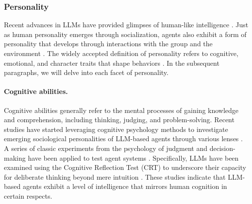 \subsubsection{Personality}\label{sec:social personality}
Recent advances in LLMs have provided glimpses of human-like intelligence \cite{browning2023personhood}. 
Just as human personality emerges through socialization, agents also exhibit a form of personality that develops through interactions with the group and the environment \cite{DBLP:journals/corr/abs-2206-07550, DBLP:journals/corr/abs-2302-02083}. 
The widely accepted definition of personality refers to cognitive, emotional, and character traits that shape behaviors \cite{zuckerman1991psychobiology}.
In the subsequent paragraphs, we will delve into each facet of personality.

\paragraph{Cognitive abilities.}
Cognitive abilities generally refer to the mental processes of gaining knowledge and comprehension, including thinking, judging, and problem-solving. 
Recent studies have started leveraging cognitive psychology methods to investigate emerging sociological personalities of LLM-based agents through various lenses \cite{DBLP:journals/corr/abs-2206-14576, DBLP:journals/corr/abs-2303-11436, DBLP:journals/corr/abs-2303-13988}.
A series of classic experiments from the psychology of judgment and decision-making have been applied to test agent systems \cite{DBLP:journals/corr/abs-2207-07051, DBLP:journals/corr/abs-2206-14576, DBLP:journals/corr/abs-2303-11436, DBLP:journals/corr/abs-2306-06548}. Specifically, LLMs have been examined using the Cognitive Reflection Test (CRT) to underscore their capacity for deliberate thinking beyond mere intuition \cite{hagendorff2023thinking, DBLP:journals/corr/abs-2306-07622}.
These studies indicate that LLM-based agents exhibit a level of intelligence that mirrors human cognition in certain respects.

